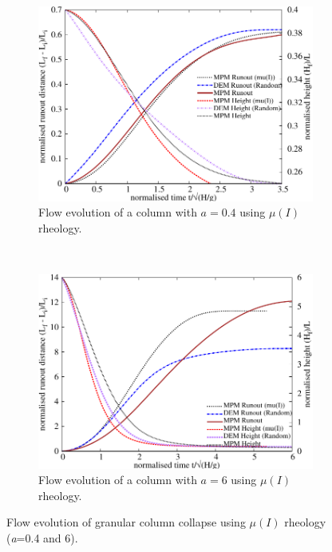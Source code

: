 \begin{figure}[tbhp]
\centering
\begin{subfigure}[b]{0.9\textwidth}
\includegraphics[width=\textwidth]{flowa04muI}
\caption{Flow evolution of a column with $a=0.4$ using $\mu(I)$ rheology.}
\label{fig:flowa04muI}
\end{subfigure}
\\
\begin{subfigure}[b]{0.9\textwidth}
\centering
\includegraphics[width=\textwidth]{flowa6muI}
\caption{Flow evolution of a column with $a=6$ using $\mu(I)$ rheology.}
\label{fig:flowa6muI}
\end{subfigure}
\caption{Flow evolution of granular column collapse using $\mu(I)$ rheology 
(\textit{a}=0.4 and 6).}
\label{fig:flow_muI}
\end{figure}

